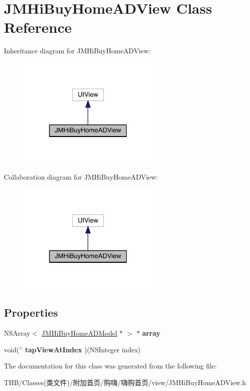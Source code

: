\hypertarget{interface_j_m_hi_buy_home_a_d_view}{}\section{J\+M\+Hi\+Buy\+Home\+A\+D\+View Class Reference}
\label{interface_j_m_hi_buy_home_a_d_view}


Inheritance diagram for J\+M\+Hi\+Buy\+Home\+A\+D\+View\+:\nopagebreak
\begin{figure}[H]
\begin{center}
\leavevmode
\includegraphics[width=198pt]{interface_j_m_hi_buy_home_a_d_view__inherit__graph}
\end{center}
\end{figure}


Collaboration diagram for J\+M\+Hi\+Buy\+Home\+A\+D\+View\+:\nopagebreak
\begin{figure}[H]
\begin{center}
\leavevmode
\includegraphics[width=198pt]{interface_j_m_hi_buy_home_a_d_view__coll__graph}
\end{center}
\end{figure}
\subsection*{Properties}
\begin{DoxyCompactItemize}
\item 
\mbox{\label{interface_j_m_hi_buy_home_a_d_view_a3d4c8025c1e004425a85fab0dde2078f}} 
N\+S\+Array$<$ \mbox{\hyperlink{interface_j_m_hi_buy_home_a_d_model}{J\+M\+Hi\+Buy\+Home\+A\+D\+Model}} $\ast$ $>$ $\ast$ {\bfseries array}
\item 
\mbox{\label{interface_j_m_hi_buy_home_a_d_view_a568dff08640e57fc4d2e89a983bb7346}} 
void($^\wedge$ {\bfseries tap\+View\+At\+Index} )(N\+S\+Integer index)
\end{DoxyCompactItemize}


The documentation for this class was generated from the following file\+:\begin{DoxyCompactItemize}
\item 
T\+H\+B/\+Classes(类文件)/附加首页/购嗨/嗨购首页/view/J\+M\+Hi\+Buy\+Home\+A\+D\+View.\+h\end{DoxyCompactItemize}
